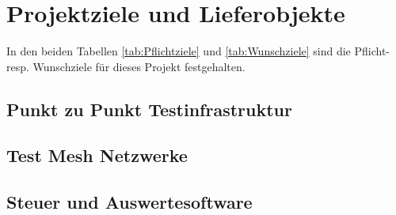 \clearpage
\section{Projektziele und Lieferobjekte}\label{sec:ProjektzieleundLieferobjekte}


In den beiden Tabellen \ref{tab:Pflichtziele} und \ref{tab:Wunschziele} sind die Pflicht- resp. Wunschziele für dieses Projekt festgehalten.

\subsection{Punkt zu Punkt Testinfrastruktur}\label{subsec:PunktzuPunktTestinfrastruktur}


\subsection{Test Mesh Netzwerke}\label{subsec:TestMeshNetzwerke}


\subsection{Steuer und Auswertesoftware}\label{subsec:SteuerundAuswertesoftware}




